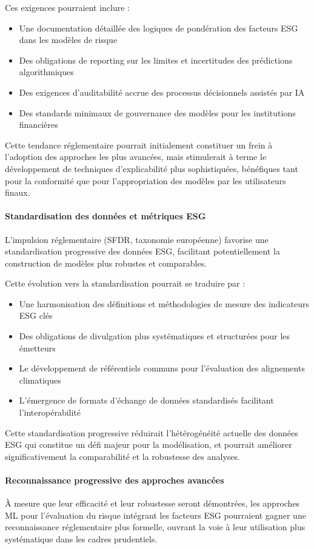 Ces exigences pourraient inclure :
\begin{itemize}
    \item Une documentation détaillée des logiques de pondération des facteurs ESG dans les modèles de risque
    \item Des obligations de reporting sur les limites et incertitudes des prédictions algorithmiques
    \item Des exigences d'auditabilité accrue des processus décisionnels assistés par IA
    \item Des standards minimaux de gouvernance des modèles pour les institutions financières
\end{itemize}

Cette tendance réglementaire pourrait initialement constituer un frein à l'adoption des approches les plus avancées, mais stimulerait à terme le développement de techniques d'explicabilité plus sophistiquées, bénéfiques tant pour la conformité que pour l'appropriation des modèles par les utilisateurs finaux.

\paragraph{Standardisation des données et métriques ESG} 
L'impulsion réglementaire (SFDR, taxonomie européenne) favorise une standardisation progressive des données ESG, facilitant potentiellement la construction de modèles plus robustes et comparables.

Cette évolution vers la standardisation pourrait se traduire par :
\begin{itemize}
    \item Une harmonisation des définitions et méthodologies de mesure des indicateurs ESG clés
    \item Des obligations de divulgation plus systématiques et structurées pour les émetteurs
    \item Le développement de référentiels communs pour l'évaluation des alignements climatiques
    \item L'émergence de formats d'échange de données standardisés facilitant l'interopérabilité
\end{itemize}

Cette standardisation progressive réduirait l'hétérogénéité actuelle des données ESG qui constitue un défi majeur pour la modélisation, et pourrait améliorer significativement la comparabilité et la robustesse des analyses.

\paragraph{Reconnaissance progressive des approches avancées} 
À mesure que leur efficacité et leur robustesse seront démontrées, les approches ML pour l'évaluation du risque intégrant les facteurs ESG pourraient gagner une reconnaissance réglementaire plus formelle, ouvrant la voie à leur utilisation plus systématique dans les cadres prudentiels.

